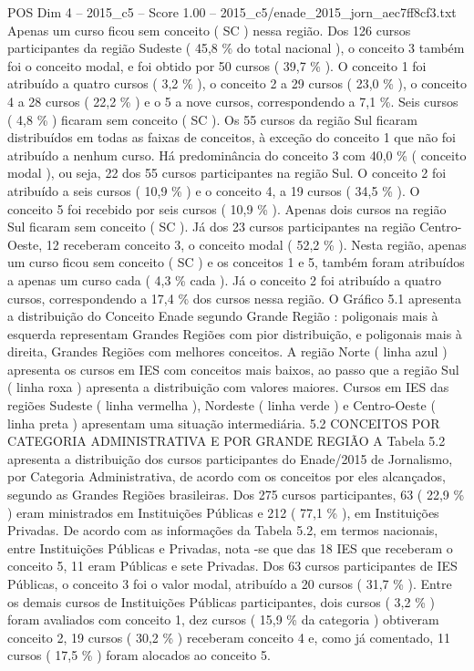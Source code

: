 \begin{textsample}{POS Dim 4 – 2015\_c5 – Score 1.00 – 2015\_c5/enade\_2015\_jorn\_aec7ff8cf3.txt}
Apenas um curso ficou sem conceito ( SC ) nessa região.
Dos 126 cursos participantes da região Sudeste ( 45,8 \% do total nacional ), o conceito 3 também foi o conceito modal, e foi obtido por 50 cursos ( 39,7 \% ).
O conceito 1 foi atribuído a quatro cursos ( 3,2 \% ), o conceito 2 a 29 cursos ( 23,0 \% ), o conceito 4 a 28 cursos ( 22,2 \% ) e o 5 a nove cursos, correspondendo a 7,1 \%.
Seis cursos ( 4,8 \% ) ficaram sem conceito ( SC ).
Os 55 cursos da região Sul ficaram distribuídos em todas as faixas de conceitos, à exceção do conceito 1 que não foi atribuído a nenhum curso.
Há predominância do conceito 3 com 40,0 \% ( conceito modal ), ou seja, 22 dos 55 cursos participantes na região Sul.
O conceito 2 foi atribuído a seis cursos ( 10,9 \% ) e o conceito 4, a 19 cursos ( 34,5 \% ).
O conceito 5 foi recebido por seis cursos ( 10,9 \% ).
Apenas dois cursos na região Sul ficaram sem conceito ( SC ).
Já dos 23 cursos participantes na região Centro-Oeste, 12 receberam conceito 3, o conceito modal ( 52,2 \% ).
Nesta região, apenas um curso ficou sem conceito ( SC ) e os conceitos 1 e 5, também foram atribuídos a apenas um curso cada ( 4,3 \% cada ).
Já o conceito 2 foi atribuído a quatro cursos, correspondendo a 17,4 \% dos cursos nessa região.
O Gráfico 5.1 apresenta a distribuição do Conceito Enade segundo Grande Região : poligonais mais à esquerda representam Grandes Regiões com pior distribuição, e poligonais mais à direita, Grandes Regiões com melhores conceitos.
A região Norte ( linha azul ) apresenta os cursos em IES com conceitos mais baixos, ao passo que a região Sul ( linha roxa ) apresenta a distribuição com valores maiores.
Cursos em IES das regiões Sudeste ( linha vermelha ), Nordeste ( linha verde ) e Centro-Oeste ( linha preta ) apresentam uma situação intermediária. 5.2 CONCEITOS POR CATEGORIA ADMINISTRATIVA E POR GRANDE REGIÃO A Tabela 5.2 apresenta a distribuição dos cursos participantes do Enade/2015 de Jornalismo, por Categoria Administrativa, de acordo com os conceitos por eles alcançados, segundo as Grandes Regiões brasileiras.
Dos 275 cursos participantes, 63 ( 22,9 \% ) eram ministrados em Instituições Públicas e 212 ( 77,1 \% ), em Instituições Privadas.
De acordo com as informações da Tabela 5.2, em termos nacionais, entre Instituições Públicas e Privadas, nota -se que das 18 IES que receberam o conceito 5, 11 eram Públicas e sete Privadas.
Dos 63 cursos participantes de IES Públicas, o conceito 3 foi o valor modal, atribuído a 20 cursos ( 31,7 \% ).
Entre os demais cursos de Instituições Públicas participantes, dois cursos ( 3,2 \% ) foram avaliados com conceito 1, dez cursos ( 15,9 \% da categoria ) obtiveram conceito 2, 19 cursos ( 30,2 \% ) receberam conceito 4 e, como já comentado, 11 cursos ( 17,5 \% ) foram alocados ao conceito 5.

\end{textsample}
